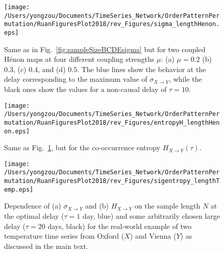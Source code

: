 \documentclass[aps,pre,superscriptaddress,floats,11pt]{revtex4}
\begin{document}
\begin{figure}[htb]
	\centering
	\texttt{[image: /Users/yongzou/Documents/TimeSeries\_Network/OrderPatternPermutation/RuanFiguresPlot2018/rev\_Figures/sigma\_lengthHenon.eps]}
\caption{Same as in Fig.~\ref{fig:sampleSizeBCDEsigma} but for two coupled H\'enon maps at four different coupling strengths $\mu$: (a) $\mu=0.2$ (b) $0.3$, (c) $0.4$, and (d) $0.5$. The blue lines show the behavior at the delay corresponding to the maximum value of $\sigma_{X\to Y}$, while the black ones show the values for a non-causal delay of $\tau=10$. \label{fig:sampleSizeHenonsigma}}
\end{figure}

\begin{figure}[htb]
	\centering
	\texttt{[image: /Users/yongzou/Documents/TimeSeries\_Network/OrderPatternPermutation/RuanFiguresPlot2018/rev\_Figures/entropyH\_lengthHenon.eps]}
\caption{Same as Fig.~\ref{fig:sampleSizeHenonsigma}, but for the co-occurrence entropy $H_{X\to Y}(\tau)$. \label{fig:sampleSizeHenonentropy}}
\end{figure}

\begin{figure}[htb]
	\centering
	\texttt{[image: /Users/yongzou/Documents/TimeSeries\_Network/OrderPatternPermutation/RuanFiguresPlot2018/rev\_Figures/sigentropy\_lengthTemp.eps]}
\caption{Dependence of (a) $\sigma_{X\to Y}$ and (b) $H_{X\to Y}$ on the sample length $N$ at the optimal delay ($\tau=1$ day, blue) and some arbitrarily chosen large delay ($\tau=20$ days, black) for the real-world example of two temperature time series from Oxford ($X$) and Vienna ($Y$) as discussed in the main text. \label{fig:sampleSizeTempentropy}}
\end{figure}
\end{document}

